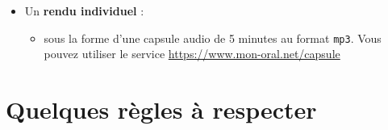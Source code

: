 \documentclass[a4paper, french, 12pt]{article}  %
\begin{document}
\begin{enumerate}
\begin{itemize}
\begin{itemize}
\begin{itemize}
			\end{itemize}
			
     \end{itemize}
  \item Un \textbf{rendu individuel}  :
  \begin{itemize} 
  \item {}  sous la forme d'une capsule audio de 5 minutes   au format \texttt{mp3}. Vous pouvez utiliser le service \url{https://www.mon-oral.net/capsule}
  			\end{itemize}
    \end{itemize}
\end{enumerate}

\section{Quelques règles à respecter}
\end{document}
